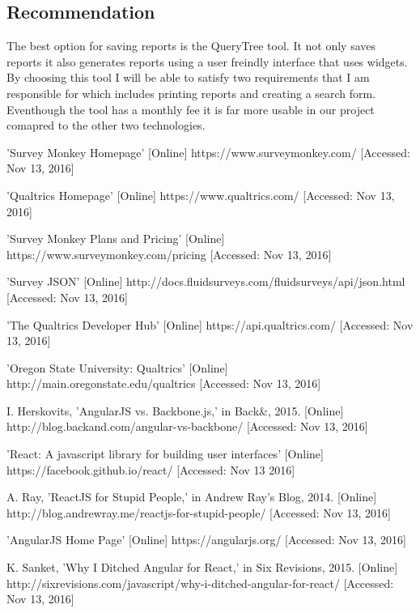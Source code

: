 \documentclass[letterpaper,10pt,serif, draftclsnofoot,onecolumn, compsoc, titlepage]{IEEEtran}
\begin{document}
\subsection{Recommendation} 
The best option for saving reports is the QueryTree tool. It not only saves reports it also generates reports using a user freindly interface that uses widgets. By choosing this tool I will be able to satisfy two requirements that I am responsible for which includes printing reports and creating a search form. Eventhough the tool has a monthly fee it is far more usable in our project comapred to the other two technologies. 

\begin{thebibliography}{2}
'Survey Monkey Homepage' [Online] https://www.surveymonkey.com/ [Accessed: Nov 13, 2016]

'Qualtrics Homepage' [Online] https://www.qualtrics.com/ [Accessed: Nov 13, 2016]

'Survey Monkey Plans and Pricing' [Online] https://www.surveymonkey.com/pricing [Accessed: Nov 13, 2016]

'Survey JSON' [Online] http://docs.fluidsurveys.com/fluidsurveys/api/json.html [Accessed: Nov 13, 2016]

'The Qualtrics Developer Hub' [Online] https://api.qualtrics.com/ [Accessed: Nov 13, 2016]

'Oregon State University: Qualtrics' [Online] http://main.oregonstate.edu/qualtrics [Accessed: Nov 13, 2016]

I. Herskovits, 'AngularJS vs. Backbone.js,' in Back\&, 2015. [Online] http://blog.backand.com/angular-vs-backbone/ [Accessed: Nov 13, 2016]

'React: A javascript library for building user interfaces' [Online] https://facebook.github.io/react/ [Accessed: Nov 13 2016]

A. Ray, 'ReactJS for Stupid People,' in Andrew Ray’s Blog, 2014. [Online] http://blog.andrewray.me/reactjs-for-stupid-people/ [Accessed: Nov 13, 2016]

'AngularJS Home Page' [Online] https://angularjs.org/ [Accessed: Nov 13, 2016]

K. Sanket, 'Why I Ditched Angular for React,' in Six Revisions, 2015. [Online] http://sixrevisions.com/javascript/why-i-ditched-angular-for-react/ [Accessed: Nov 13, 2016]


\end{thebibliography}
\end{document}
